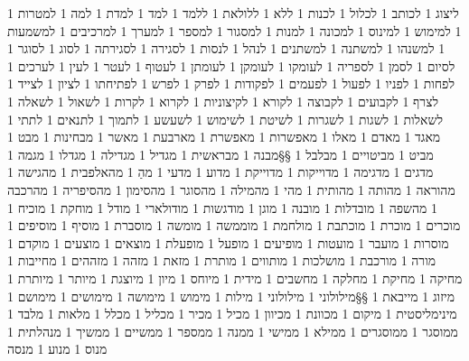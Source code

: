       1 ליצוג
      1 לכותב
      1 לכלול
      1 לכנות
      1 ללא
      1 ללולאת
      1 ללמד
      1 למד
      1 למדת
      1 למה
      1 למטרות
      1 למימוש
      1 למינוס
      1 למכונה
      1 למנות
      1 למסגור
      1 למספר
      1 למערך
      1 למרכיבים
      1 למשמעות
      1 למשנהו
      1 למשתנה
      1 למשתנים
      1 לנהל
      1 לנסות
      1 לסגירה
      1 לסגירתה
      1 לסוג
      1 לסוגר
      1 לסיום
      1 לסמן
      1 לספריה
      1 לעומקו
      1 לעומקן
      1 לעומתן
      1 לעטוף
      1 לעטר
      1 לעין
      1 לערכים
      1 לפחות
      1 לפניו
      1 לפעול
      1 לפעמים
      1 לפקודות
      1 לפרק
      1 לפרש
      1 לפתיחתו
      1 לציון
      1 לצייד
      1 לצרף
      1 לקבועים
      1 לקבוצה
      1 לקורא
      1 לקיצוניות
      1 לקרוא
      1 לקרות
      1 לשאול
      1 לשאלה
      1 לשאלות
      1 לשגות
      1 לשגרות
      1 לשיטת
      1 לשימוש
      1 לשעשע
      1 לתמוך
      1 לתנאים
      1 לתתי
      1 מאגד
      1 מאדם
      1 מאלו
      1 מאפשרות
      1 מאפשרת
      1 מארבעת
      1 מאשר
      1 מבחינות
      1 מבט
      1 מביט
      1 מביטויים
      1 מבלבל
      1 §§מבנה
      1 מבראשית
      1 מגדיל
      1 מגדילה
      1 מגדלו
      1 מגמה
      1 מדגים
      1 מדגימה
      1 מדוייקות
      1 מדוייקת
      1 מדוע
      1 מדעי
      1 מהַ
      1 מהאלפבית
      1 מהגישה
      1 מהוראה
      1 מהותה
      1 מהותית
      1 מהי
      1 מהמילה
      1 מהסוגר
      1 מהסימון
      1 מהסיפריה
      1 מהרכבה
      1 מהשפה
      1 מובדלות
      1 מובנה
      1 מוגן
      1 מודגשות
      1 מודולארי
      1 מודל
      1 מוחקת
      1 מוכיח
      1 מוכרים
      1 מוכרת
      1 מוכתבת
      1 מולחמת
      1 מוממשה
      1 מומשה
      1 מוסברת
      1 מוסיף
      1 מוסיפים
      1 מוסרות
      1 מועבר
      1 מועטות
      1 מופיעים
      1 מופעל
      1 מופעלת
      1 מוצאים
      1 מוצעים
      1 מוקדם
      1 מורה
      1 מורכבת
      1 מושלכות
      1 מותווים
      1 מותרת
      1 מזאת
      1 מזהה
      1 מזההים
      1 מחייבות
      1 מחיקה
      1 מחיקת
      1 מחלקה
      1 מחשבים
      1 מידית
      1 מיוחס
      1 מיון
      1 מיוצגת
      1 מיותר
      1 מיותרת
      1 מיזוג
      1 מייבאת
      1 §§מילולוני
      1 מילולוני
      1 מילות
      1 מימוש
      1 מימושה
      1 מימושים
      1 מימושם
      1 מינימליסטית
      1 מיקום
      1 מכוונת
      1 מכיוון
      1 מכיל
      1 מכיר
      1 מכליל
      1 מכלל
      1 מלאות
      1 מלבד
      1 ממוסגר
      1 ממוסגרים
      1 ממילא
      1 ממישי
      1 ממנה
      1 ממספר
      1 ממשיים
      1 ממשיך
      1 מנהלתית
      1 מנוס
      1 מנוע
      1 מנסה
